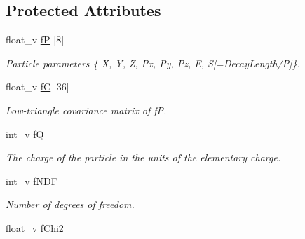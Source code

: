 \subsection*{Protected Attributes}
\begin{DoxyCompactItemize}
\item 
float\+\_\+v \hyperlink{classKFParticleBaseSIMD_a112eb61d3426e5fa2f98a73fb6f2c8e8}{fP} \mbox{[}8\mbox{]}\hypertarget{classKFParticleBaseSIMD_a112eb61d3426e5fa2f98a73fb6f2c8e8}{}\label{classKFParticleBaseSIMD_a112eb61d3426e5fa2f98a73fb6f2c8e8}

\begin{DoxyCompactList}\small\item\em Particle parameters \{ X, Y, Z, Px, Py, Pz, E, S\mbox{[}=Decay\+Length/P\mbox{]}\}. \end{DoxyCompactList}\item 
float\+\_\+v \hyperlink{classKFParticleBaseSIMD_a0a2d89649f3876d56874e4373b1be5b1}{fC} \mbox{[}36\mbox{]}\hypertarget{classKFParticleBaseSIMD_a0a2d89649f3876d56874e4373b1be5b1}{}\label{classKFParticleBaseSIMD_a0a2d89649f3876d56874e4373b1be5b1}

\begin{DoxyCompactList}\small\item\em Low-\/triangle covariance matrix of fP. \end{DoxyCompactList}\item 
int\+\_\+v \hyperlink{classKFParticleBaseSIMD_a94025d7ab80d0ed5c663a3292f534b15}{fQ}\hypertarget{classKFParticleBaseSIMD_a94025d7ab80d0ed5c663a3292f534b15}{}\label{classKFParticleBaseSIMD_a94025d7ab80d0ed5c663a3292f534b15}

\begin{DoxyCompactList}\small\item\em The charge of the particle in the units of the elementary charge. \end{DoxyCompactList}\item 
int\+\_\+v \hyperlink{classKFParticleBaseSIMD_ad51213e8e023679f60016f428b08a220}{f\+N\+DF}\hypertarget{classKFParticleBaseSIMD_ad51213e8e023679f60016f428b08a220}{}\label{classKFParticleBaseSIMD_ad51213e8e023679f60016f428b08a220}

\begin{DoxyCompactList}\small\item\em Number of degrees of freedom. \end{DoxyCompactList}\item 
float\+\_\+v \hyperlink{classKFParticleBaseSIMD_adba176e03b9eadb9494eded3e7a77b59}{f\+Chi2}\hypertarget{classKFParticleBaseSIMD_adba176e03b9eadb9494eded3e7a77b59}{}\label{classKFParticleBaseSIMD_adba176e03b9eadb9494eded3e7a77b59}


\end{DoxyCompactItemize}

